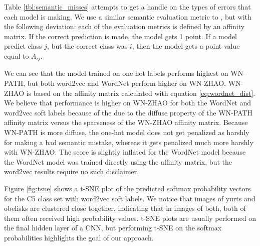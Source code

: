 Table \ref{tbl:semantic_misses} attempts to get a handle on the types of errors
that each model is making. We use a similar semantic evaluation metric to
\cite{zhao2011large}, but with the following deviation: each of the evaluation
metrics is defined by an affinity matrix. If the correct prediction is made, the
model gets 1 point. If a model predict class $j$, but the correct class was $i$,
then the model gets a point value equal to $A_{ij}$.

We can see that the model trained on one hot labels performs highest on WN-PATH,
but both word2vec and WordNet perform higher on WN-ZHAO. WN-ZHAO is based on the
affinity matrix calculated with equation \ref{eq:wordnet_dist}. We believe that
performance is higher on WN-ZHAO for both the WordNet and word2vec soft labels
because of the due to the diffuse property of the WN-PATH affinity matrix versus
the sparseness of the WN-ZHAO affinity matrix. Because WN-PATH is more diffuse,
the one-hot model does not get penalized as harshly for making a bad semantic
mistake, whereas it gets penalized much more harshly with WN-ZHAO. The score is
slightly inflated for the WordNet model because the WordNet model was trained
directly using the affinity matrix, but the word2vec results require no such
disclaimer.

Figure \ref{fig:tsne} shows a t-SNE plot of the predicted softmax probability
vectors for the C5 class set with word2vec soft labels. We notice that images of
yurts and obelisks are clustered close together, indicating that in images of
both, both of them often received high probability values. t-SNE plots are
usually performed on the final hidden layer of a CNN, but performing t-SNE on
the softmax probabilities highlights the goal of our approach.



%
